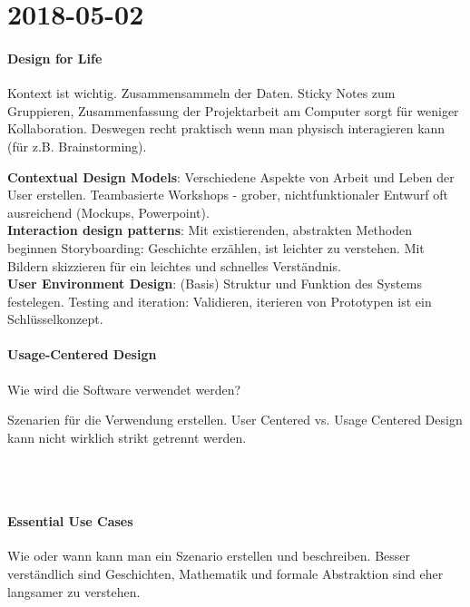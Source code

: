 \section{2018-05-02}

\paragraph{Design for Life}

Kontext ist wichtig.
Zusammensammeln der Daten.
Sticky Notes zum Gruppieren, Zusammenfassung der Projektarbeit am Computer sorgt
für weniger Kollaboration. Deswegen recht praktisch wenn man physisch interagieren
kann (für z.B. Brainstorming).

\textbf{Contextual Design Models}: Verschiedene Aspekte von Arbeit und Leben der User erstellen.
Teambasierte Workshops - grober, nichtfunktionaler Entwurf oft ausreichend (Mockups,
Powerpoint). \\
\textbf{Interaction design patterns}: Mit existierenden, abstrakten Methoden beginnen
Storyboarding: Geschichte erzählen, ist leichter zu verstehen. Mit Bildern skizzieren
für ein leichtes und schnelles Verständnis. \\
\textbf{User Environment Design}: (Basis) Struktur und Funktion des Systems festelegen.
Testing and iteration: Validieren, iterieren von Prototypen ist ein Schlüsselkonzept.\\

\paragraph{Usage-Centered Design}
Wie wird die Software verwendet werden?

Szenarien für die Verwendung erstellen. User Centered vs. Usage Centered Design
kann nicht wirklich strikt getrennt werden. 

\\
\noindent{}
\\

\paragraph{Essential Use Cases}
Wie oder wann kann man ein Szenario erstellen und beschreiben. 
Besser verständlich sind Geschichten, Mathematik und formale Abstraktion sind 
eher langsamer zu verstehen. 

